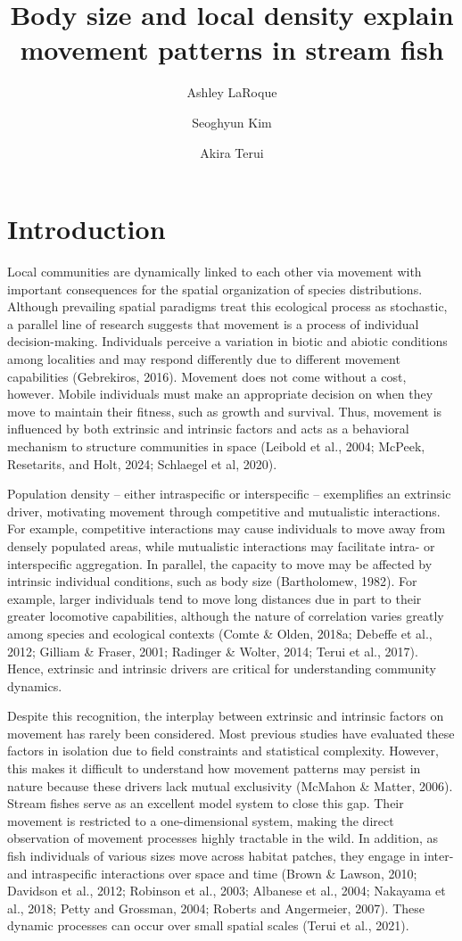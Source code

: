 \documentclass[11pt, class=article, crop=false]{standalone}
\title{Body size and local density explain movement patterns in stream fish}
\date{} %
\author[1]{Ashley LaRoque}
\author[2]{Seoghyun Kim}
\author[1]{Akira Terui}
\affil[1]{Depatment of Biology, University of North Carolina at Greensboro}
\affil[2]{XXX}
\begin{document}
\maketitle

\section{Introduction}

Local communities are dynamically linked to each other via movement with important consequences for the spatial organization of species distributions. Although prevailing spatial paradigms treat this ecological process as stochastic, a parallel line of research suggests that movement is a process of individual decision-making. Individuals perceive a variation in biotic and abiotic conditions among localities and may respond differently due to different movement capabilities (Gebrekiros, 2016). Movement does not come without a cost, however. Mobile individuals must make an appropriate decision on when they move to maintain their fitness, such as growth and survival. Thus, movement is influenced by both extrinsic and intrinsic factors and acts as a behavioral mechanism to structure communities in space (Leibold et al., 2004; McPeek, Resetarits, and Holt, 2024; Schlaegel et al, 2020). 

Population density – either intraspecific or interspecific – exemplifies an extrinsic driver, motivating movement through competitive and mutualistic interactions. For example, competitive interactions may cause individuals to move away from densely populated areas, while mutualistic interactions may facilitate intra- or interspecific aggregation. In parallel, the capacity to move may be affected by intrinsic individual conditions, such as body size (Bartholomew, 1982). For example,  larger individuals tend to move long distances due in part to their greater locomotive capabilities, although the nature of correlation varies greatly among species and ecological contexts  (Comte \& Olden, 2018a; Debeffe et al., 2012; Gilliam \& Fraser, 2001; Radinger \& Wolter, 2014; Terui et al., 2017). Hence, extrinsic and intrinsic drivers are critical for understanding community dynamics.

Despite this recognition, the interplay between extrinsic and intrinsic factors on movement has rarely been considered. Most previous studies have evaluated these factors in isolation due to field constraints and statistical complexity. However, this makes it difficult to understand how movement patterns may persist in nature because these drivers lack mutual exclusivity (McMahon \& Matter, 2006). Stream fishes serve as an excellent model system to close this gap. Their movement is restricted to a one-dimensional system, making the direct observation of movement processes highly tractable in the wild. In addition, as fish individuals of various sizes move across habitat patches, they engage in inter- and intraspecific interactions over space and time (Brown \& Lawson, 2010; Davidson et al., 2012; Robinson et al., 2003; Albanese et al., 2004; Nakayama et al., 2018; Petty and Grossman, 2004; Roberts and Angermeier, 2007). These dynamic processes can occur over small spatial scales (Terui et al., 2021). 
\end{document}
